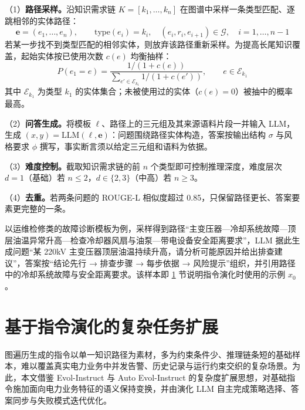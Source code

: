 \documentclass[fontset=fandol,type=master,campus=shenzhen,etitleauto=true]{hithesisbook}
\begin{document}
（1）\textbf{路径采样。}沿知识需求链 $K = [k_1, \ldots, k_n]$ 在图谱中采样一条类型匹配、逐跳相邻的实体路径：
\begin{equation}\label{eq:path}
\mathbf{e} = (e_1, \ldots, e_n), \qquad \text{type}(e_i) = k_i, \quad (e_i, r_i, e_{i+1}) \in \mathcal{G}, \quad i = 1, \ldots, n-1
\end{equation}
若某一步找不到类型匹配的相邻实体，则放弃该路径重新采样。为提高长尾知识覆盖，起始实体按已使用次数 $c(e)$ 均衡抽样：
\begin{equation}\label{eq:start-entity}
P(e_1 = e) = \frac{1 / (1 + c(e))}{\sum_{e' \in \mathcal{E}_{k_1}} 1 / (1 + c(e'))}, \qquad e \in \mathcal{E}_{k_1}
\end{equation}
其中 $\mathcal{E}_{k_1}$ 为类型 $k_1$ 的实体集合；未被使用过的实体（$c(e) = 0$）被抽中的概率最高。

（2）\textbf{问答生成。}将模板 $\ell$、路径上的三元组及其来源语料片段一并输入 LLM，生成 $(x, y) = \text{LLM}(\ell, \mathbf{e})$：问题围绕路径实体构造，答案按输出结构 $\sigma$ 与风格要求 $\phi$ 撰写，事实断言须以给定三元组和语料为依据。

（3）\textbf{难度控制。}截取知识需求链的前 $n$ 个类型即可控制推理深度，难度层次 $d = 1$（基础）若 $n \le 2$，$d \in \{2, 3\}$（中高）若 $n \ge 3$。

（4）\textbf{去重。}若两条问题的 ROUGE-L 相似度\cite{ref75}超过 0.85，只保留路径更长、答案要素更完整的一条。

以运维检修类的故障诊断模板为例，采样得到路径“主变压器—冷却系统故障—顶层油温异常升高—检查冷却器风扇与油泵—带电设备安全距离要求”，LLM 据此生成问题“某 220kV 主变压器顶层油温持续升高，请分析可能原因并给出排查建议”，答案按“结论先行 → 排查步骤 → 每步依据 → 风险提示”组织，并引用路径中的冷却系统故障与安全距离要求。该样本即 \ref{ux57faux4e8eux6307ux4ee4ux6f14ux5316ux7684ux590dux6742ux4efbux52a1ux6269ux5c55} 节说明指令演化时使用的示例 $x_0$。

\section{基于指令演化的复杂任务扩展}\label{ux57faux4e8eux6307ux4ee4ux6f14ux5316ux7684ux590dux6742ux4efbux52a1ux6269ux5c55}

图遍历生成的指令以单一知识路径为素材，多为约束条件少、推理链条短的基础样本，难以覆盖真实电力业务中并发告警、历史记录与运行约束交织的复杂场景。为此，本文借鉴 Evol-Instruct\cite{ref25} 与 Auto Evol-Instruct\cite{ref53} 的复杂度扩展思想，对基础指令施加面向电力业务特征的语义保持变换，并由演化 LLM 自主完成策略选择、答案同步与失败模式迭代优化。
\end{document}
